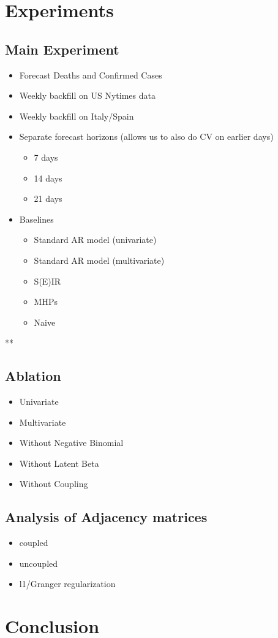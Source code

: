 \documentclass{article}
\begin{document}
\section{Experiments}
\label{sec:orgd50071c}
\subsection{Main Experiment}
\label{sec:org7a8df4c}
\begin{itemize}
\item Forecast Deaths and Confirmed Cases
\item Weekly backfill on US Nytimes data
\item Weekly backfill on Italy/Spain
\item Separate forecast horizons (allows us to also do CV on earlier days)
\begin{itemize}
\item 7 days
\item 14 days
\item 21 days
\end{itemize}
\item Baselines
\begin{itemize}
\item Standard AR model (univariate)
\item Standard AR model (multivariate)
\item S(E)IR
\item MHPs
\item Naive
\end{itemize}
\end{itemize}

**
\subsection{Ablation}
\label{sec:org1aae541}
\begin{itemize}
\item Univariate
\item Multivariate
\item Without Negative Binomial
\item Without Latent Beta
\item Without Coupling
\end{itemize}

\subsection{Analysis of Adjacency matrices}
\label{sec:orgbce42b4}
\begin{itemize}
\item coupled
\item uncoupled
\item l1/Granger regularization
\end{itemize}

\section{Conclusion}
\label{sec:org184985c}

\printbibliography
\end{document}

